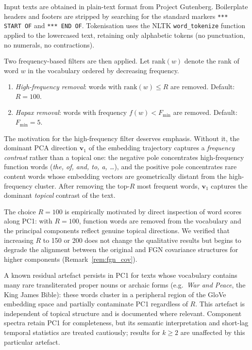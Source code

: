 \documentclass[12pt,a4paper]{article}
\begin{document}
Input texts are obtained in plain-text format from Project Gutenberg.
Boilerplate headers and footers are stripped by searching for the
standard markers \texttt{*** START OF} and \texttt{*** END OF}.
Tokenisation uses the NLTK \texttt{word\_tokenize} function applied to
the lowercased text, retaining only alphabetic tokens (no punctuation,
no numerals, no contractions).

Two frequency-based filters are then applied.
Let $\mathrm{rank}(w)$ denote the rank of word $w$ in the vocabulary
ordered by decreasing frequency.
\begin{enumerate}
  \item \emph{High-frequency removal}: words with
        $\mathrm{rank}(w) \leq R$ are removed.
        Default: $R = 100$.
  \item \emph{Hapax removal}: words with frequency $f(w) < F_{\min}$
        are removed.
        Default: $F_{\min} = 5$.
\end{enumerate}
The motivation for the high-frequency filter deserves emphasis.
Without it, the dominant PCA direction $\mathbf{v}_1$ of the embedding
trajectory captures a \emph{frequency contrast} rather than a topical
one: the negative pole concentrates high-frequency function words
(\emph{the, of, and, to, a, \ldots}), and the positive pole concentrates
rare content words whose embedding vectors are geometrically distant
from the high-frequency cluster.
After removing the top-$R$ most frequent words, $\mathbf{v}_1$
captures the dominant \emph{topical} contrast of the text.

The choice $R = 100$ is empirically motivated by direct inspection of
word scores along PC1: with $R = 100$, function words are removed
from the vocabulary and the principal components reflect genuine
topical directions.
We verified that increasing $R$ to 150 or 200 does not change the
qualitative results but begins to degrade the alignment between the
original and FGN covariance structures for higher components
(Remark~\ref{rem:fgn_cov}).

A known residual artefact persists in PC1 for texts whose vocabulary
contains many rare transliterated proper nouns or archaic forms
(e.g.\ \emph{War and Peace}, the King James Bible): these words
cluster in a peripheral region of the GloVe embedding space and
partially contaminate PC1 regardless of $R$.
This artefact is independent of topical structure and is documented
where relevant. Component spectra retain PC1 for completeness, but its
semantic interpretation and short-lag temporal statistics are treated
cautiously; results for $k \geq 2$ are unaffected by this particular
artefact.
\end{document}

